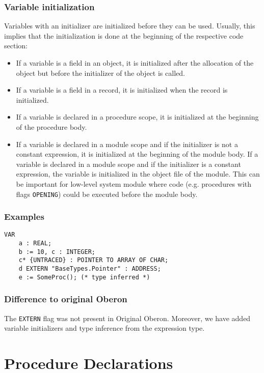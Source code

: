\documentclass[a4wide,11pt]{article}
\begin{document}
\subsubsection{Variable initialization}
Variables with an initializer are initialized before they can be used.
Usually, this implies that the initialization is done at the beginning of the respective code section:
\begin{itemize}
\item If a variable is a field in an object, it is initialized after the allocation of the object but before the initializer of the object is called.
\item If a variable is a field in a record, it is initialized when the record is initialized.
\item If a variable is declared in a procedure scope, it is initialized at the beginning of the procedure body.
\item If a variable is declared in a module scope and if the initializer is not a constant expression, it is initialized at the beginning of the module body.
If a variable is declared in a module scope and if the initializer is a constant expression, the variable is initialized in the object file of the module.
This can be important for low-level system module where code (e.g. procedures with flags \lstinline"OPENING") could be executed before the module body.
\end{itemize}

\begin{annotation}
\subsubsection{Examples}
\begin{lstlisting}[style=example]
VAR
	a : REAL;
	b := 10, c : INTEGER;
	c* {UNTRACED} : POINTER TO ARRAY OF CHAR;
	d EXTERN "BaseTypes.Pointer" : ADDRESS;
	e := SomeProc(); (* type inferred *)
\end{lstlisting}



\subsubsection{Difference to original Oberon}
The \lstinline"EXTERN" flag was not present in Original Oberon. Moreover, we have added variable initializers and type inference from the expression type.
\end{annotation}

\section{Procedure Declarations}
\end{document}
